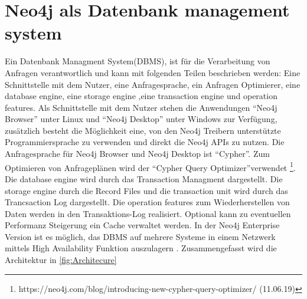 
\section{Neo4j als Datenbank management system}
Ein Datenbank Managment System(DBMS), ist für die Verarbeitung von Anfragen verantwortlich und kann mit folgenden Teilen beschrieben werden: Eine Schnittstelle mit dem Nutzer, eine Anfragesprache, ein Anfragen Optimierer, eine database engine, eine storage engine ,eine transaction engine und operation features\parencite{angles2012comparison}. Als Schnittstelle mit dem Nutzer stehen die Anwendungen “Neo4j Browser” unter Linux und “Neo4j Desktop” unter Windows zur Verfügung, zusätzlich besteht die Möglichkeit eine, von den Neo4j Treibern unterstützte Programmiersprache zu verwenden und direkt die Neo4j APIs zu nutzen. Die Anfragesprache für Neo4j Browser und Neo4j Desktop ist “Cypher”. Zum Optimieren von Anfrageplänen wird der “Cypher Query Optimizer”verwendet \footnote{https://neo4j.com/blog/introducing-new-cypher-query-optimizer/  (11.06.19)}. Die database engine wird durch das Transaction Managment dargestellt. Die storage engine durch die Record Files und die transaction unit  wird durch das Trancsaction Log dargestellt. Die operation features zum Wiederherstellen von Daten werden in den Transaktions-Log realisiert. Optional kann zu eventuellen Performanz Steigerung ein Cache verwaltet werden. In der Neo4j Enterprise Version ist es möglich, das DBMS auf mehrere Systeme in einem Netzwerk mittels High Availability Funktion auszulagern \parencite{vukotic2015neo4j}. Zusammengefasst wird die Architektur in \ref{fig:Architecure}

